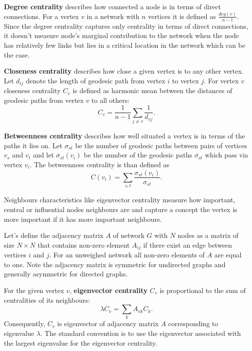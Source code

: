 \documentclass[times, utf8, diplomski]{fer}
\begin{document}
\textbf{Degree centrality} describes how connected a node is in terms of direct connections. For a vertex $v$ in a network with $n$ vertices it is defined as $\frac{deg(v)}{n - 1}$. Since the degree centrality captures only centrality in terms of direct connections, it doesn't measure node's marginal contribution to the network when the node has relatively few links  but lies in a critical location in the network which can be the case.

\textbf{Closeness centrality} describes how close a given vertex is to any other vertex.  Let $d_{ij}$ denote the length of geodesic path from vertex $i$ to vertex $j$. 
For  vertex $v$ closeness centrality $C_v$ is defined as harmonic mean between the distances of geodesic paths from vertex $v$ to all others:
\begin{equation}
C_v = \frac{1}{n - 1} \sum_{j \neq v} \frac{1}{d_{vj}}. 
\label{clos}
\end{equation}

\textbf{Betweenness centrality} describes how well situated a vertex is in terms of the paths it lies on. Let $\sigma_{st}$ be the number of geodesic paths between pairs of vertices $v_s$ and $v_t$ and let $\sigma_{st}(v_i)$ be the number of the geodesic paths $\sigma_{st}$  which pass via vertex $v_i$. The betweenness centrality is than defined as 
\begin{equation}
C(v_i) = \sum_{s, t} \frac{\sigma_{st}(v_i)}{\sigma_{st}}.
\label{betw}
\end{equation}

Neighbours characteristics like  eigenvector centrality measure how important, central or influential nodes neighbours are and  capture a concept the vertex is more important if it has more important neighbours.  

Let's define the adjacency matrix $A$ of network $G$ with $N$ nodes as a matrix of size $N \times N$ that contains non-zero element $A_{ij}$ if there exist an edge between vertices $i$ and $j$. For an unweighed network all non-zero elements of $A$ are equal to one.  Note the adjacency matrix is symmetric for undirected graphs and generally asymmetric for  directed graphs. 

For the given vertex $v$,  \textbf{ eigenvector centrality } $C_v$ \cite{bonacich1987power} is proportional to the sum of  centralities of its neighbours: 
\begin{equation}
\lambda C_v = \sum_{k} A_{vk} C_k.
\label{eig}
\end{equation}
 Consequently, $C_v$ is eigenvector of adjacency matrix $A$ corresponding to eigenvalue $\lambda$.  The standard convention is to use the eigenvector associated with the largest eigenvalue for the eigenvector centrality. 
\end{document}
